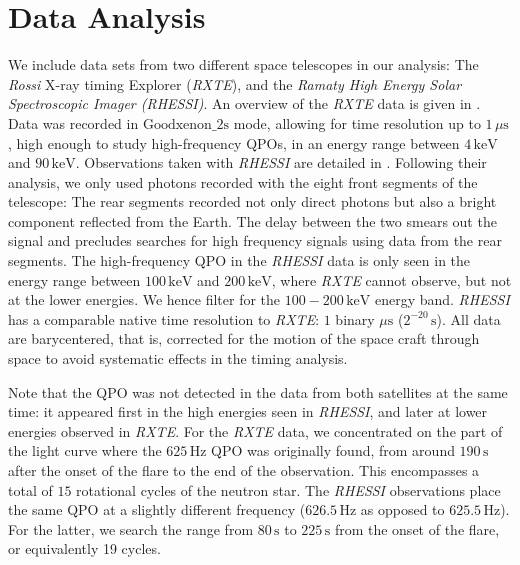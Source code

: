 \documentclass{emulateapj}
\begin{document}
\section{Data Analysis}
\label{sec:analysis}

We include data sets from two different space telescopes in our analysis: The {\it Rossi} X-ray timing Explorer ({\it RXTE}), and the {\it Ramaty High Energy Solar Spectroscopic Imager (RHESSI)}. An overview of the {\it RXTE} data is given in \citet{Israel05}. Data was recorded in $\mathrm{Goodxenon\_2s}$ mode, allowing for time resolution up to $1 \, \mu \mathrm{s}$, high enough to study high-frequency QPOs, in an energy range between $4 \, \mathrm{keV}$ and $90 \, \mathrm{keV}$.
Observations taken with {\it RHESSI} are detailed in \citet{Watts06}. Following their analysis, we only used photons recorded with the eight front segments of the telescope: The rear segments recorded not only direct photons but also a bright component reflected from the Earth. The delay between the two smears out the signal and precludes searches for high frequency signals using data from the rear segments. The high-frequency QPO in the {\it RHESSI} data is only seen in the energy range between $100 \, \mathrm{keV}$ and $200 \, \mathrm{keV}$, where {\it RXTE} cannot observe, but not at the lower energies. We hence filter for the $100 - 200 \, \mathrm{keV}$ energy band.  {\it RHESSI} has a comparable native time resolution to {\it RXTE}: $1$ binary $\mu\mathrm{s}$ ($2^{-20} \, \mathrm{s}$). All data are barycentered, that is, corrected for the motion of the space craft through space to avoid systematic effects in the timing analysis.

Note that the QPO was not detected in the data from both satellites at the same time: it appeared first in the high energies seen in {\it RHESSI}, and later at lower energies observed in {\it RXTE}.
For the {\it RXTE} data, we concentrated on the part of the light curve where the $625 \, \mathrm{Hz}$ QPO was originally found, from around $190\, \mathrm{s}$ after the onset of the flare to the end of the observation. This encompasses a total of $15$ rotational cycles of the neutron star. The {\it RHESSI} observations place the same QPO at a slightly different frequency ($626.5 \, \mathrm{Hz}$ as opposed to $625.5 \, \mathrm{Hz}$). For the latter, we search the range from $80\, \mathrm{s}$ to $225 \, \mathrm{s}$ from the onset of the flare, or equivalently 19 cycles.
\end{document}
